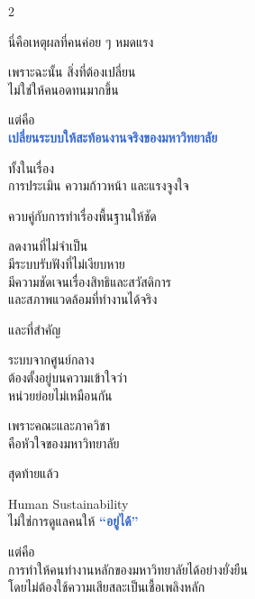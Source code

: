 \documentclass[10pt]{article}
\begin{document}
\begin{tcolorbox}[breakable,colback=panel,colframe=line,boxrule=0.5pt,arc=2mm,left=3mm,right=3mm,top=2mm,bottom=2mm]
\begin{multicols}{2}
\par นี่คือเหตุผลที่คนค่อย ๆ หมดแรง
\par เพราะฉะนั้น สิ่งที่ต้องเปลี่ยน\\ ไม่ใช่ให้คนอดทนมากขึ้น
\par แต่คือ\\ \textbf{\textcolor{highlight}{เปลี่ยนระบบให้สะท้อนงานจริงของมหาวิทยาลัย}}
\par ทั้งในเรื่อง\\ การประเมิน ความก้าวหน้า และแรงจูงใจ
\par ควบคู่กับการทำเรื่องพื้นฐานให้ชัด
\par ลดงานที่ไม่จำเป็น\\ มีระบบรับฟังที่ไม่เงียบหาย\\ มีความชัดเจนเรื่องสิทธิและสวัสดิการ\\ และสภาพแวดล้อมที่ทำงานได้จริง
\par และที่สำคัญ
\par ระบบจากศูนย์กลาง\\ ต้องตั้งอยู่บนความเข้าใจว่า\\ หน่วยย่อยไม่เหมือนกัน
\par เพราะคณะและภาควิชา\\ คือหัวใจของมหาวิทยาลัย
\par สุดท้ายแล้ว
\par Human Sustainability\\ ไม่ใช่การดูแลคนให้ \textbf{\textcolor{highlight}{“อยู่ได้”}}
\par แต่คือ\\ การทำให้คนทำงานหลักของมหาวิทยาลัยได้อย่างยั่งยืน\\ โดยไม่ต้องใช้ความเสียสละเป็นเชื้อเพลิงหลัก
\end{multicols}
\end{tcolorbox}

\clearpage
\end{document}
